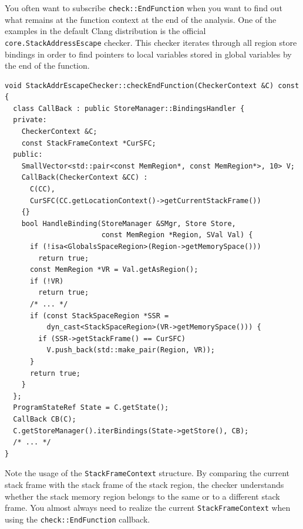 \documentclass[a4paper,12pt]{article}
\newenvironment{nobr}{\begin{minipage}{\textwidth}\setlength\parskip{1em}
}{\end{minipage}\ignorespacesafterend}
\begin{document}
You often want to subscribe \lstinline|check::EndFunction| when you want to find out what remains at the function context at the end of the analysis. One of the examples in the default Clang distribution is the official \lstinline|core.StackAddressEscape| checker. This checker iterates through all region store bindings in order to find pointers to local variables stored in global variables by the end of the function.

\begin{nobr}
\begin{lstlisting}[style=cplusplus]
void StackAddrEscapeChecker::checkEndFunction(CheckerContext &C) const {
  class CallBack : public StoreManager::BindingsHandler {
  private:
    CheckerContext &C;
    const StackFrameContext *CurSFC;
  public:
    SmallVector<std::pair<const MemRegion*, const MemRegion*>, 10> V;
    CallBack(CheckerContext &CC) :
      C(CC),
      CurSFC(CC.getLocationContext()->getCurrentStackFrame())
    {}
    bool HandleBinding(StoreManager &SMgr, Store Store,
                       const MemRegion *Region, SVal Val) {
      if (!isa<GlobalsSpaceRegion>(Region->getMemorySpace()))
        return true;
      const MemRegion *VR = Val.getAsRegion();
      if (!VR)
        return true;
      /* ... */
      if (const StackSpaceRegion *SSR = 
          dyn_cast<StackSpaceRegion>(VR->getMemorySpace())) {
        if (SSR->getStackFrame() == CurSFC)
          V.push_back(std::make_pair(Region, VR));
      }
      return true;
    }
  };
  ProgramStateRef State = C.getState();
  CallBack CB(C);
  C.getStoreManager().iterBindings(State->getStore(), CB);
  /* ... */
}
\end{lstlisting}
\end{nobr}

Note the usage of the \lstinline|StackFrameContext| structure. By comparing the current stack frame with the stack frame of the stack region, the checker understands whether the stack memory region belongs to the same or to a different stack frame. You almost always need to realize the current  \lstinline|StackFrameContext| when using the \lstinline|check::EndFunction| callback.
\end{document}
